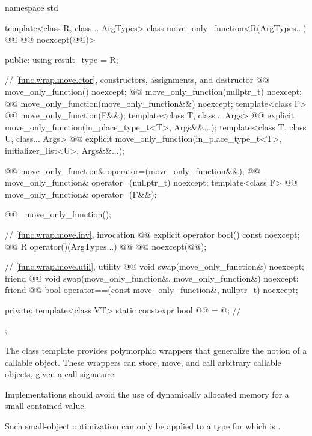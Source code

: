 \begin{codeblock}
namespace std {
  template<class R, class... ArgTypes>
  class move_only_function<R(ArgTypes...) @\cv{}@ @@ noexcept(@@)> {
  public:
    using result_type = R;

    // \ref{func.wrap.move.ctor}, constructors, assignments, and destructor
    @@ move_only_function() noexcept;
    @@ move_only_function(nullptr_t) noexcept;
    @@ move_only_function(move_only_function&&) noexcept;
    template<class F> @@ move_only_function(F&&);
    template<class T, class... Args>
      @@ explicit move_only_function(in_place_type_t<T>, Args&&...);
    template<class T, class U, class... Args>
      @@ explicit move_only_function(in_place_type_t<T>, initializer_list<U>, Args&&...);

    @@ move_only_function& operator=(move_only_function&&);
    @@ move_only_function& operator=(nullptr_t) noexcept;
    template<class F> @@ move_only_function& operator=(F&&);

    @@ ~move_only_function();

    // \ref{func.wrap.move.inv}, invocation
    @@ explicit operator bool() const noexcept;
    @@ R operator()(ArgTypes...) @\cv{}@ @@ noexcept(@@);

    // \ref{func.wrap.move.util}, utility
    @@ void swap(move_only_function&) noexcept;
    friend @@ void swap(move_only_function&, move_only_function&) noexcept;
    friend @@ bool operator==(const move_only_function&, nullptr_t) noexcept;

  private:
    template<class VT>
      static constexpr bool @@ = @\seebelow@;       // \expos
  };
}
\end{codeblock}

\pnum
The  class template provides polymorphic wrappers that generalize the notion of a callable object. These wrappers can store, move, and call arbitrary callable objects, given a call signature.

\pnum
\recommended
Implementations should avoid the use of dynamically allocated memory for a small contained value.
\begin{note}
Such small-object optimization can only be applied to a type  for which  is .
\end{note}

